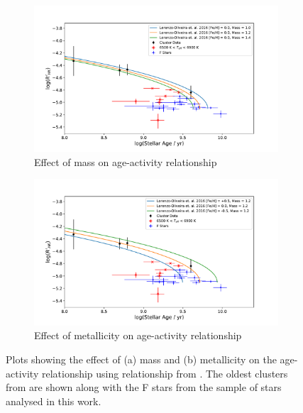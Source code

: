 \begin{figure}
    \centering
    \begin{subfigure}{\textwidth}
        \centering
        \includegraphics[scale=0.55]{Figures/4-Chromospheric_age/ca_results_LO_mass_w_hotstars.pdf}
        \caption{Effect of mass on age-activity relationship}
    \end{subfigure}
    \begin{subfigure}{\textwidth}
        \centering
        \includegraphics[scale=0.55]{Figures/4-Chromospheric_age/ca_results_LO_metallicity_w_hotstars.pdf}
        \caption{Effect of metallicity on age-activity relationship}
    \end{subfigure}
    \caption[Effect of mass and metallicity on the age-activity relationship]{Plots showing the effect of (a) mass and (b) metallicity on the age-activity relationship using relationship from \citet{Lorenzo_Oliveira_etal_2016}. The oldest clusters from \citet{Mamajek_Hillenbrand_2008} are shown along with the F stars from the sample of stars analysed in this work.}
    \label{fig:LO_plot}
\end{figure}

